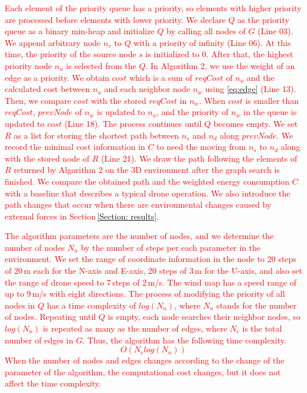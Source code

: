 \documentclass[journal]{./template/IEEEtran}
\begin{document}
\textcolor{red}{Each element of the priority queue has a priority, so elements with higher priority are processed before elements with lower priority.
We declare $Q$ as the priority queue as a binary min-heap and initialize $Q$ by calling all nodes of $G$ (Line 03).
We append arbitrary node $n_v$ to $Q$ with a priority of infinity (Line 06). 
At this time, the priority of the source node $s$ is initialized to 0.
After that, the highest priority node $n_u$ is selected from the $Q$. 
In Algorithm 2, we use the weight of an edge as a priority.
We obtain $cost$ which is a sum of $reqCost$ of $n_u$ and the calculated cost between $n_u$ and each neighbor node $n_w$ using \eqref{eq:edge} (Line 13). 
Then, we compare $cost$ with the stored $reqCost$ in $n_w$.
When $cost$ is smaller than $reqCost$, $prevNode$ of $n_w$ is updated to $n_u$, and the priority of $n_w$ in the queue is updated to $cost$ (Line 18).
The process continues until $Q$ becomes empty.
We set $R$ as a list for storing the shortest path between $n_s$ and $n_d$ along $prevNode$.
We record the minimal cost information in $C$ to need the moving from $n_s$ to $n_d$ along with the stored node of $R$ (Line 21).
We draw the path following the elements of $R$ returned by Algorithm 2 on the 3D environment after the graph search is finished.
We compare the obtained path and the weighted energy consumption $C$ with a baseline that describes a typical drone operation. 
We also introduce the path changes that occur when there are environmental changes caused by external forces in Section\,\ref{Section: results}.}


\textcolor{red}{
The algorithm parameters are the number of nodes, and we determine the number of nodes $N_n$ by the number of steps per each parameter in the environment.  
We set the range of coordinate information in the node to 20 steps of 20\,m each for the N-axis and E-axis, 20 steps of 3\,m for the U-axis, and also set the range of drone speed to 7\,steps of 2\,m/s. 
The wind map has a speed range of up to 9\,m/s with eight directions.
The process of modifying the priority of all nodes in $Q$ has a time complexity of $log(N_n)$, where $N_n$ stands for the number of nodes.
Repeating until $Q$ is empty, each node searches their neighbor nodes, so $log(N_n)$ is repeated as many as the number of edges, where $N_e$ is the total number of edges in $G$. 
Thus, the algorithm has the following time complexity.
\begin{equation*}
O(N_elog(N_n)) \tag{6.3} \label{eq:complexity}
\end{equation*}
When the number of nodes and edges changes according to the change of the parameter of the algorithm, the computational cost changes, but it does not affect the time complexity.
}
\end{document}
